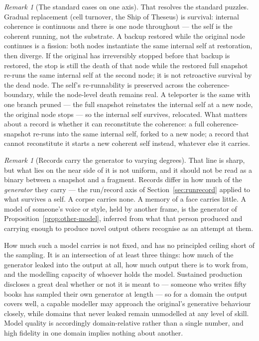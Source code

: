 \documentclass[11pt,a4paper]{article}
\theoremstyle{remark}\newtheorem{remark}[definition]{Remark}
\begin{document}
\begin{remark}[The standard cases on one axis]\label{rem:identity-cases}
That resolves the standard puzzles. Gradual replacement (cell turnover, the Ship of Theseus)
is survival: internal coherence is continuous and there is one node throughout --- the
self is the coherent running, not the substrate. A backup restored while the original node continues is a
fission: both nodes instantiate the same internal self at restoration, then diverge. If the original
has irreversibly stopped before that backup is restored, the stop is still the death of that node while
the restored full snapshot re-runs the same internal self at the second node; it is not retroactive
survival by the dead node. The self's re-runnability is preserved across the coherence-boundary, while
the node-level death remains real. A teleporter is the same with one branch pruned --- the full snapshot
reinstates the internal self at a new node, the original node stops --- so the internal
self survives, relocated. What matters about a record is whether it can reconstitute the
coherence: a full coherence-snapshot re-runs into the same internal self, forked to a new node;
a record that cannot reconstitute it starts a new coherent self instead, whatever else it
carries.
\end{remark}

\begin{remark}[Records carry the generator to varying degrees]\label{rem:record-gradient}
That line is sharp, but what lies on the near side of it is not uniform, and it should
not be read as a binary between a snapshot and a fragment. Records differ in how much of the
\emph{generator} they carry --- the run/record axis of Section~\ref{sec:runrecord} applied to
what survives a self. A corpse carries none. A memory of a face carries little. A model of
someone's voice or style, held by another frame, is the generator of
Proposition~\ref{prop:other-model}, inferred from what that person produced and carrying enough to
produce novel output others recognise as an attempt at them.

How much such a model carries is not fixed, and has no principled ceiling short of the sampling.
It is an intersection of at least three things: how much of the generator leaked into the output
at all, how much output there is to work from, and the modelling capacity of whoever holds the
model. Sustained production discloses a great deal whether or not it is meant to --- someone who
writes fifty books has sampled their own generator at length --- so for a domain the output covers
well, a capable modeller may approach the original's generative behaviour closely, while domains
that never leaked remain unmodelled at any level of skill. Model quality is accordingly
domain-relative rather than a single number, and high fidelity in one domain implies nothing about
another.
\end{remark}
\end{document}
